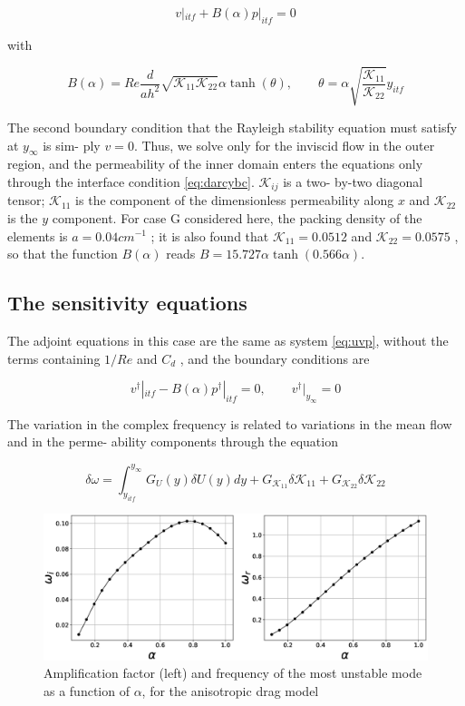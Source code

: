 \begin{equation}
v|_{itf} + B(\alpha) p|_{itf} = 0
\label{eq:darcybc}
\end{equation}

with

$$
B(\alpha) = Re \dfrac{d}{ah^2} \sqrt{\mathcal{K}_{11}\mathcal{K}_{22}} \alpha \tanh (\theta), \qquad \theta = \alpha \sqrt{\dfrac{\mathcal{K}_{11}}{\mathcal{K}_{22}}}  y_{itf}
$$

The second boundary condition that the Rayleigh stability equation must satisfy at $y_{\infty}$ is sim-
ply $v = 0$. Thus, we solve only for the inviscid flow in the outer region, and the permeability
of the inner domain enters the equations only through the interface condition \ref{eq:darcybc}. $\mathcal{K}_{ij}$ is a two-
by-two diagonal tensor; $\mathcal{K}_{11}$ is the component of the dimensionless permeability along $x$ and
$\mathcal{K}_{22}$ is the $y$ component. For case G considered here, the packing density of the elements is
$a = 0.04 cm^{-1}$ ; it is also found that $\mathcal{K}_{11}= 0.0512$ and $\mathcal{K}_{22} = 0.0575$ \citet{zampognaprivate},  so that the function $B(\alpha)$
reads $B = 15.727 \alpha \tanh (0.566 \alpha)$.


\subsection{The sensitivity equations}

The adjoint equations in this case are the same as system \ref{eq:uvp}, without the terms containing $1/Re$
and $C_d$ , and the boundary conditions are

\begin{equation}
v^{\dagger}|_{itf} - B(\alpha) p^{\dagger}|_{itf} = 0, \qquad v^{\dagger}|_{y_{\infty}} = 0
\label{eq:darcybc_adjoint}
\end{equation}

The variation in the complex frequency is related to variations in the mean flow and in the perme-
ability components through the equation

$$
\delta \omega = \int_{y_{itf}}^{y_{\infty}}  G_U(y) \delta U(y) dy + G_{\mathcal{K}_{11}} \delta \mathcal{K}_{11} + G_{\mathcal{K}_{22}} \delta \mathcal{K}_{22}
$$

\begin{figure}[H]
	\centering
	\includegraphics[width=1\linewidth]{chapter_3/figure/6}
	\caption{Amplification factor (left) and frequency of the most unstable mode as a function of $\alpha$, for the anisotropic drag
		model}
	\label{fig:6}
\end{figure}


